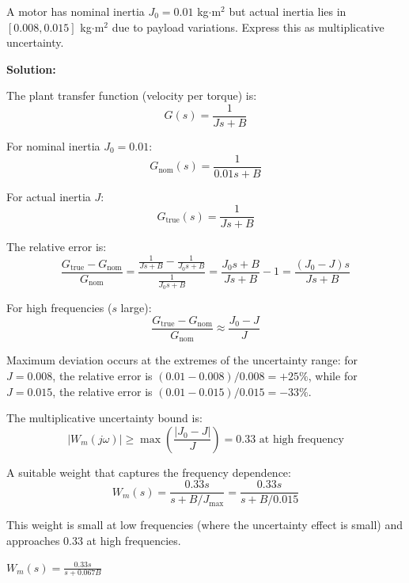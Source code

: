 \begin{example}
\label{ex:parametric}
A motor has nominal inertia $J_0 = 0.01$ kg$\cdot$m$^2$ but actual inertia lies in $[0.008, 0.015]$ kg$\cdot$m$^2$ due to payload variations. Express this as multiplicative uncertainty.

\textbf{Solution:}

The plant transfer function (velocity per torque) is:
\begin{equation*}
G(s) = \frac{1}{Js + B}
\end{equation*}

For nominal inertia $J_0 = 0.01$:
\begin{equation*}
G_{\text{nom}}(s) = \frac{1}{0.01s + B}
\end{equation*}

For actual inertia $J$:
\begin{equation*}
G_{\text{true}}(s) = \frac{1}{Js + B}
\end{equation*}

The relative error is:
\begin{equation*}
\frac{G_{\text{true}} - G_{\text{nom}}}{G_{\text{nom}}} = \frac{\frac{1}{Js+B} - \frac{1}{J_0 s + B}}{\frac{1}{J_0 s + B}} = \frac{J_0 s + B}{Js + B} - 1 = \frac{(J_0 - J)s}{Js + B}
\end{equation*}

For high frequencies ($s$ large):
\begin{equation*}
\frac{G_{\text{true}} - G_{\text{nom}}}{G_{\text{nom}}} \approx \frac{J_0 - J}{J}
\end{equation*}

Maximum deviation occurs at the extremes of the uncertainty range: for $J = 0.008$, the relative error is $(0.01 - 0.008)/0.008 = +25\%$, while for $J = 0.015$, the relative error is $(0.01 - 0.015)/0.015 = -33\%$.

The multiplicative uncertainty bound is:
\begin{equation*}
|W_m(j\omega)| \geq \max\left(\frac{|J_0 - J|}{J}\right) = 0.33 \text{ at high frequency}
\end{equation*}

A suitable weight that captures the frequency dependence:
\begin{equation*}
W_m(s) = \frac{0.33s}{s + B/J_{\max}} = \frac{0.33s}{s + B/0.015}
\end{equation*}

This weight is small at low frequencies (where the uncertainty effect is small) and approaches 0.33 at high frequencies.

$\boxed{W_m(s) = \frac{0.33s}{s + 0.067B}}$
\end{example}


